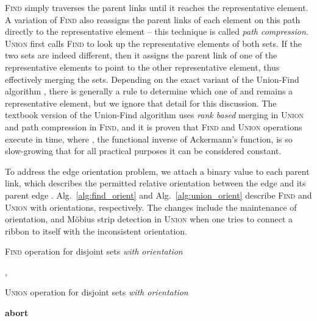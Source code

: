 \documentclass[oneeqnum,onethmnum,onefignum,onetabnum]{siamltex1213}
\begin{document}
\textsc{Find} simply traverses the parent links until it reaches the
representative element.  A variation of \textsc{Find} also reassigns the parent
links of each element on this path directly to the representative element --
this technique is called \emph{path compression}.
\textsc{Union} first calls \textsc{Find} to look up the representative elements
of both sets. If the two sets are indeed different, then it assigns the
parent link of one of the representative elements to point to the other
representative element, thus effectively merging the sets.
Depending on the exact variant of the Union-Find algorithm \cite{Patwary2010},
there is generally a rule to determine which one of  and  remains
a representative element, but we ignore that detail for this discussion.
The textbook version of the Union-Find algorithm \cite{tarjan1975efficiency}
uses \emph{rank based} merging in \textsc{Union} and path compression in
\textsc{Find}, and it is proven that  \textsc{Find} and 
\textsc{Union} operations execute in  time, where
, the functional inverse of Ackermann's function, is so
slow-growing that for all practical purposes it can be considered constant.

To address the edge orientation problem, we attach a binary value
 to each parent link, which describes the
permitted relative orientation between the edge  and its parent
edge .  Alg.~\ref{alg:find_orient} and
Alg.~\ref{alg:union_orient} describe \textsc{Find} and \textsc{Union}
with orientations, respectively.
The changes include the maintenance of orientation, and Möbius strip
detection in \textsc{Union} when one tries to connect a ribbon to
itself with the inconsistent orientation.

\begin{algorithm}
  \caption{\textsc{Find} operation for disjoint sets \emph{with orientation}}
  \label{alg:find_orient}
  \begin{algorithmic}[1]
    \If {}
      \State \Return , 
    \Else
      \State  {}
      \State \Return 
    \EndIf
    \EndFunction
  \end{algorithmic}
\end{algorithm}

\begin{algorithm}
  \caption{\textsc{Union} operation for disjoint sets \emph{with orientation}}
  \label{alg:union_orient}
  \begin{algorithmic}[1]
    \State  {}
    \State  {}

    \If {}
      \If {}
        \State \textbf{abort}
      \EndIf
    \Else
      \State 
    \EndIf
    \EndProcedure
  \end{algorithmic}
\end{algorithm}
\end{document}
